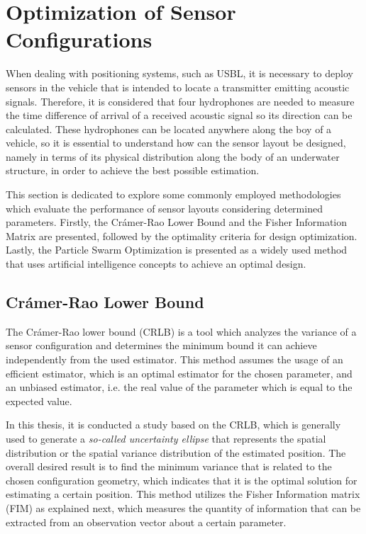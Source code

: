 \section{Optimization of Sensor Configurations}

When dealing with positioning systems, such as USBL, it is necessary to deploy sensors in the vehicle that is intended to locate a transmitter emitting acoustic signals. Therefore, it is considered that four hydrophones are needed to measure the time difference of arrival of a received acoustic signal so its direction can be calculated. These hydrophones can be located anywhere along the boy of a vehicle, so it is essential to understand how can the sensor layout be designed, namely in terms of its physical distribution along the body of an underwater structure, in order to achieve the best possible estimation. 

This section is dedicated to explore some commonly employed methodologies which evaluate the performance of sensor layouts considering determined parameters. Firstly, the Crámer-Rao Lower Bound and the Fisher Information Matrix are presented, followed by the optimality criteria for design optimization. Lastly, the Particle Swarm Optimization is presented as a widely used method that uses artificial intelligence concepts to achieve an optimal design.

\subsection{Crámer-Rao Lower Bound}	\label{sec:cramer}

The Crámer-Rao lower bound (CRLB) is a tool which analyzes the variance of a sensor configuration and determines the minimum bound it can achieve independently from the used estimator. This method assumes the usage of an efficient estimator, which is an optimal estimator for the chosen parameter, and an unbiased estimator, i.e. the real value of the parameter which is equal to the expected value.

In this thesis, it is conducted a study based on the CRLB, which is generally used to generate a \textit{so-called uncertainty ellipse} \cite{bishop-cramer-rao} that represents the spatial distribution or the spatial variance distribution of the estimated position. The overall desired result is to find the minimum variance that is related to the chosen configuration geometry, which indicates that it is the optimal solution for estimating a certain position. This method utilizes the Fisher Information matrix (FIM) as explained next, which measures the quantity of information that can be extracted from an observation vector about a certain parameter.

